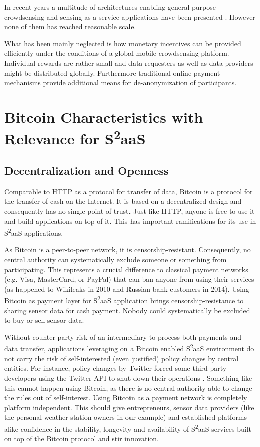 In recent years a multitude of architectures enabling general purpose crowdsensing and sensing as a service applications have been presented \cite{6558754,6525603,giannotti2012planetary,Haderer2015,merlino2016mobile}. However none of them has reached reasonable scale.

What has been mainly neglected is how monetary incentives can be provided efficiently under the conditions of a global mobile crowdsensing platform. 
Individual rewards are rather small and data requesters as well as data providers might be distributed globally. Furthermore traditional online payment mechanisms provide additional means for de-anonymization of participants. 

\section{Bitcoin Characteristics with Relevance for S\textsuperscript{2}aaS}

\subsection{Decentralization and Openness}

Comparable to HTTP as a protocol for transfer of data, Bitcoin is a protocol for the transfer of cash on the Internet. It is based on a decentralized design and consequently has no single point of trust. Just like HTTP, anyone is free to use it and build applications on top of it. This has important ramifications for its use in S\textsuperscript{2}aaS applications.

As Bitcoin is a peer-to-peer network, it is censorship-resistant. Consequently, no central authority can systematically exclude someone or something from participating. This represents a crucial difference to classical payment networks (e.g. Visa, MasterCard, or PayPal) that can ban anyone from using their services (as happened to Wikileaks in 2010 and Russian bank customers in 2014). Using Bitcoin as payment layer for S\textsuperscript{2}aaS application brings censorship-resistance to sharing sensor data for cash payment. Nobody could systematically be excluded to buy or sell sensor data.

Without counter-party risk of an intermediary to process both payments and data transfer, applications leveraging on a Bitcoin enabled S\textsuperscript{2}aaS  environment do not carry the risk of self-interested (even justified) policy changes by central entities. For instance, policy changes by Twitter forced some third-party developers using the Twitter API to shut down their operations \parencite{twitterAPI}. Something like this cannot happen using Bitcoin, as there is no central authority able to change the rules out of self-interest. Using Bitcoin as a payment network is completely platform independent. This should give entrepreneurs, sensor data providers (like the personal weather station owners in our example) and established platforms alike confidence in the stability, longevity and availability of S\textsuperscript{2}aaS services built on top of the Bitcoin protocol and stir innovation.


